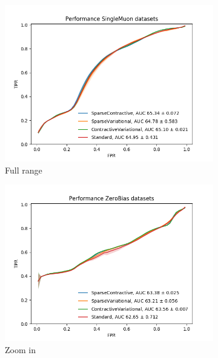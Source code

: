 \begin{figure}[h!]
\centering
    \begin{subfigure}[b]{0.49\linewidth}
        \includegraphics[width=\linewidth]{images/reco/2018/feature_2/performance_SingleMuon_SparseContractiveSparseVariationalContractiveVariationalStandard.png}
        \caption{Full range}
    \end{subfigure}
    \begin{subfigure}[b]{0.49\linewidth}
        \includegraphics[width=\linewidth]{images/reco/2018/feature_2/performance_ZeroBias_SparseContractiveSparseVariationalContractiveVariationalStandard.png}
        \caption{Zoom in}
    \end{subfigure}
    \begin{subfigure}[b]{0.49\linewidth}

\end{subfigure}
\end{figure}

